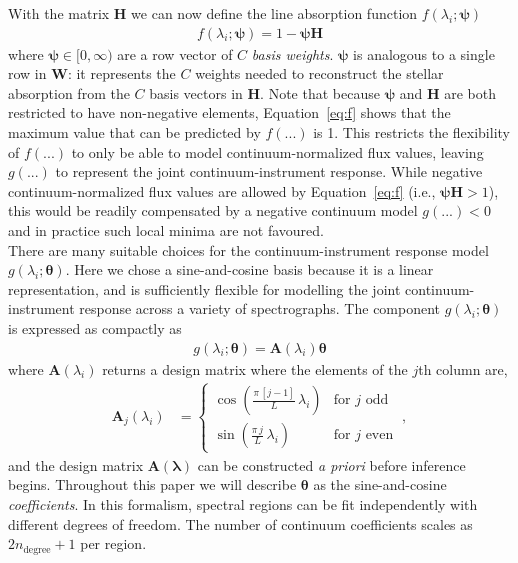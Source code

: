 \documentclass[modern]{aastex631}
\renewcommand{\vec}[1]{\mathbf{#1}}
\newcommand{\vectheta}{\boldsymbol{\theta}}
\newcommand{\vecpsi}{\boldsymbol{\psi}}
\newcommand{\vecW}{\mathbf{W}}
\newcommand{\vecH}{\mathbf{H}}
\begin{document}
\noindent{}With the matrix $\vec{H}$ we can now define the line absorption function $f(\lambda_i;\vecpsi)$ 
\begin{align}
    f(\lambda_i;\vecpsi) = 1 - \vecpsi\vecH \label{eq:f}
\end{align}
where $\vecpsi \in [0, \infty)$ are a row vector of $C$ \emph{basis weights}. $\vecpsi$ is analogous to a single row in $\vecW$: it represents the $C$ weights needed to reconstruct the stellar absorption from the $C$ basis vectors in $\vecH$. Note that because $\vecpsi$ and $\vecH$ are both restricted to have non-negative elements, Equation~\ref{eq:f} shows that the maximum value that can be predicted by $f(...)$ is 1. This restricts the flexibility of $f(...)$ to only be able to model continuum-normalized flux values, leaving $g(...)$ to represent the joint continuum-instrument response. While negative continuum-normalized flux values are allowed by Equation~\ref{eq:f} (i.e., $\vecpsi\vecH > 1$), this would be readily compensated by a negative continuum model $g(...) < 0$ and in practice such local minima are not favoured.\\

There are many suitable choices for the continuum-instrument response model $g(\lambda_i;\vectheta)$. Here we chose a sine-and-cosine basis because it is a linear representation, and is sufficiently flexible for modelling the joint continuum-instrument response across a variety of spectrographs. The component $g(\lambda_i;\vectheta)$ is expressed as compactly as
\begin{align}
    g(\lambda_i;\vectheta) = \vec{A}(\lambda_i)\vectheta
\end{align}
where $\vec{A}(\lambda_i)$ returns a design matrix where the elements of the $j$th column are,
\begin{align}
    \vec{A}_{j}(\lambda_i) & = \left\{\begin{array}{cl}\displaystyle\cos\left(\frac{\pi\,[j-1]}{L}\,\lambda_i\right) & \mbox{for $j$ odd} \\[3ex]
                                       \displaystyle\sin\left(\frac{\pi\,j}{L}\,\lambda_i\right) & \mbox{for $j$ even}\end{array}\right. ~,
\end{align}
\noindent{}and the design matrix $\vec{A}(\vec{\lambda})$ can be constructed \emph{a priori} before inference begins. Throughout this paper we will describe $\vectheta$ as the sine-and-cosine \emph{coefficients}. In this formalism, spectral regions can be fit independently with different degrees of freedom. The number of continuum coefficients scales as $2n_\textrm{degree} + 1$ per region. 
\end{document}
